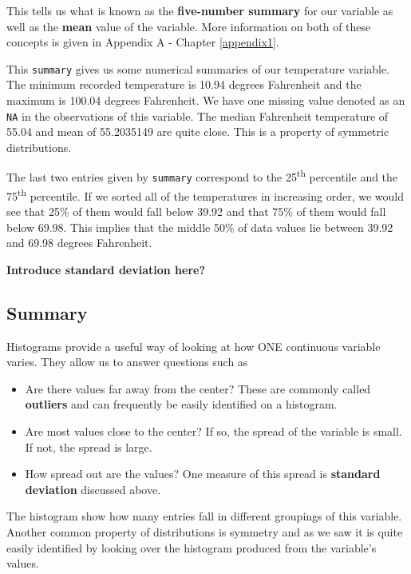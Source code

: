 \documentclass[]{tufte-book}
\providecommand{\tightlist}{%
  \setlength{\itemsep}{0pt}\setlength{\parskip}{0pt}}
\begin{document}
This tells us what is known as the \textbf{five-number summary} for our
variable as well as the \textbf{mean} value of the variable. More
information on both of these concepts is given in Appendix A - Chapter
\ref{appendix1}.

This \texttt{summary} gives us some numerical summaries of our
temperature variable. The minimum recorded temperature is 10.94 degrees
Fahrenheit and the maximum is 100.04 degrees Fahrenheit. We have one
missing value denoted as an \texttt{NA} in the observations of this
variable. The median Fahrenheit temperature of 55.04 and mean of
55.2035149 are quite close. This is a property of symmetric
distributions.

The last two entries given by \texttt{summary} correspond to the
25\textsuperscript{th} percentile and the 75\textsuperscript{th}
percentile. If we sorted all of the temperatures in increasing order, we
would see that 25\% of them would fall below 39.92 and that 75\% of them
would fall below 69.98. This implies that the middle 50\% of data values
lie between 39.92 and 69.98 degrees Fahrenheit.

\textbf{Introduce standard deviation here?}

\subsection{Summary}\label{summary}

Histograms provide a useful way of looking at how ONE continuous
variable varies. They allow us to answer questions such as

\begin{itemize}
\tightlist
\item
  Are there values far away from the center? These are commonly called
  \textbf{outliers} and can frequently be easily identified on a
  histogram.
\item
  Are most values close to the center? If so, the spread of the variable
  is small. If not, the spread is large.
\item
  How spread out are the values? One measure of this spread is
  \textbf{standard deviation} discussed above.
\end{itemize}

The histogram show how many entries fall in different groupings of this
variable. Another common property of distributions is symmetry and as we
saw it is quite easily identified by looking over the histogram produced
from the variable's values.
\end{document}
